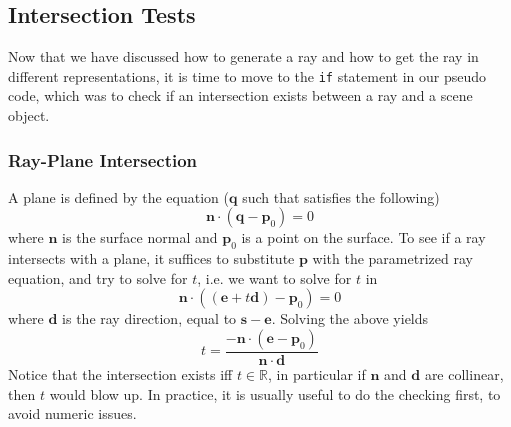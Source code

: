\documentclass[11pt]{article}
\newcommand{\bd}{\mathbf{d}}
\newcommand{\be}{\mathbf{e}}
\newcommand{\bn}{\mathbf{n}}
\newcommand{\bp}{\mathbf{p}}
\newcommand{\bq}{\mathbf{q}}
\newcommand{\bs}{\mathbf{s}}
\newcommand{\real}{\mathbb{R}}
\begin{document}
\subsection{Intersection Tests}
Now that we have discussed how to generate a ray and how to get the ray in different representations, it is time to move to the \texttt{if} statement in our pseudo code, which was to check if an intersection exists between a ray and a scene object. 
\subsubsection{Ray-Plane Intersection}
A plane is defined by the equation ($\bq$ such that satisfies the following)
\begin{equation}
	\bn \cdot ( \bq - \bp_0) = 0
\end{equation}
where $\bn$ is the surface normal and $\bp_0$ is a point on the surface. To see if a ray intersects with a plane, it suffices to substitute $\bp$ with the parametrized ray equation, and try to solve for $t$, i.e. we want to solve for $t$ in
\begin{equation}
	\bn \cdot ((\be + t\bd) - \bp_0) = 0
\end{equation}
where $\bd$ is the ray direction, equal to $\bs - \be$. Solving the above yields
\begin{equation}
	t = \frac{-\bn \cdot ( \be - \bp_0)}{\bn \cdot \bd}
\end{equation}
Notice that the intersection exists iff $t \in \real$, in particular if $\bn$ and $\bd$ are collinear, then $t$ would blow up. In practice, it is usually useful to do the checking first, to avoid numeric issues. 
\end{document}
